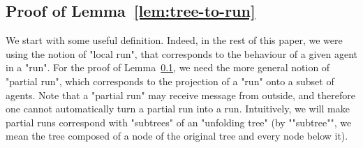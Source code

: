 \subsection{Proof of Lemma~\ref{lem:tree-to-run}}
\label{app:tree-to-run}

\LemTreeToRun*

We start with some useful definition. Indeed, in the rest of this paper, we were using the notion of "local run", that corresponds to the behaviour of a given agent in a "run". For the proof of Lemma~\ref{app:tree-to-run}, we need the more general notion of "partial run", which corresponds to the projection of a "run" onto a subset of agents. Note that a "partial run" may receive message from outside, and therefore one cannot automatically turn a partial run into a run. Intuitively, we will make partial runs correspond with "subtrees" of an "unfolding tree" (by ""subtree"", we mean the tree composed of a node of the original tree and every node below it). 

